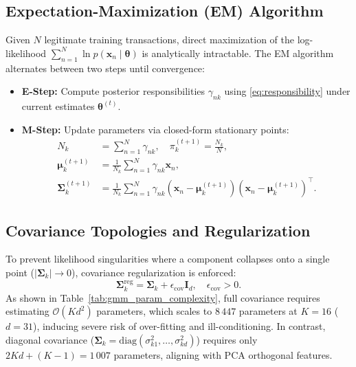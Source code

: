\subsection{Expectation-Maximization (EM) Algorithm}
Given $N$ legitimate training transactions, direct maximization of the log-likelihood $\sum_{n=1}^N \ln p(\mathbf{x}_n \mid \boldsymbol{\theta})$ is analytically intractable. The EM algorithm \cite{dempster1977maximum} alternates between two steps until convergence:
\begin{itemize}
    \item \textbf{E-Step:} Compute posterior responsibilities $\gamma_{nk}$ using \eqref{eq:responsibility} under current estimates $\boldsymbol{\theta}^{(t)}$.
    \item \textbf{M-Step:} Update parameters via closed-form stationary points:
    \begin{align}
    N_k &= \sum_{n=1}^N \gamma_{nk}, \quad \pi_k^{(t+1)} = \frac{N_k}{N}, \label{eq:m_pi} \\
    \boldsymbol{\mu}_k^{(t+1)} &= \frac{1}{N_k} \sum_{n=1}^N \gamma_{nk} \mathbf{x}_n, \label{eq:m_mu} \\
    \boldsymbol{\Sigma}_k^{(t+1)} &= \frac{1}{N_k} \sum_{n=1}^N \gamma_{nk} (\mathbf{x}_n - \boldsymbol{\mu}_k^{(t+1)})(\mathbf{x}_n - \boldsymbol{\mu}_k^{(t+1)})^\top. \label{eq:m_sigma}
    \end{align}
\end{itemize}

\subsection{Covariance Topologies and Regularization}
To prevent likelihood singularities where a component collapses onto a single point ($|\boldsymbol{\Sigma}_k| \to 0$), covariance regularization is enforced:
\begin{equation}
\boldsymbol{\Sigma}_k^{\text{reg}} = \boldsymbol{\Sigma}_k + \epsilon_{\text{cov}} \mathbf{I}_d, \quad \epsilon_{\text{cov}} > 0.
\label{eq:reg_covar}
\end{equation}
As shown in Table~\ref{tab:gmm_param_complexity}, full covariance requires estimating $\mathcal{O}(K d^2)$ parameters, which scales to $8\,447$ parameters at $K=16$ ($d=31$), inducing severe risk of over-fitting and ill-conditioning. In contrast, diagonal covariance ($\boldsymbol{\Sigma}_k = \text{diag}(\sigma_{k1}^2, \dots, \sigma_{kd}^2)$) requires only $2Kd + (K-1) = 1\,007$ parameters, aligning with PCA orthogonal features.

